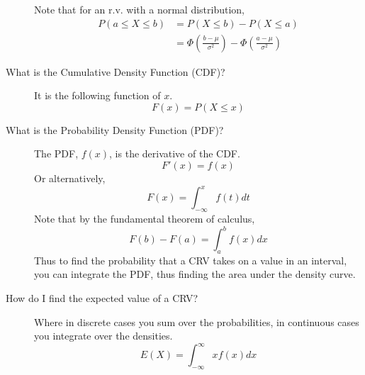 \documentclass[10pt,landscape]{article}
\theoremstyle{definition}
\begin{document}
\begin{multicols}{3}
\begin{description}
Note that for an r.v. with a normal distribution,
\begin{align*}
P(a\leq X\leq b)&=P(X\leq b)-P(X\leq a)\\
&=\Phi \left(\frac{b-\mu }{\sigma ^2} \right) - \Phi \left( \frac{a-\mu }{\sigma ^2} \right)
\end{align*}

\item[What is the Cumulative Density Function (CDF)?] It is the following function of $x$.
        \[F(x) = P(X \leq x)\]

\item[What is the Probability Density Function (PDF)?] The PDF, $f(x)$, is the derivative of the CDF. 
\[ F'(x) = f(x) \]
Or alternatively,
\[ F(x) = \int_{-\infty}^x f(t)dt \]
Note that by the fundamental theorem of calculus,
\[ F(b) - F(a) = \int^b_a f(x)dx \]
Thus to find the probability that a CRV takes on a value in an interval, you can integrate the PDF, thus finding the area under the density curve.

\item[How do I find the expected value of a CRV?] Where in discrete cases you sum over the probabilities, in continuous cases you integrate over the densities.
\[E(X) = \int^\infty_{-\infty}xf(x)dx \]
\end{description}


\label{lotus}

\end{multicols}
\end{document}
